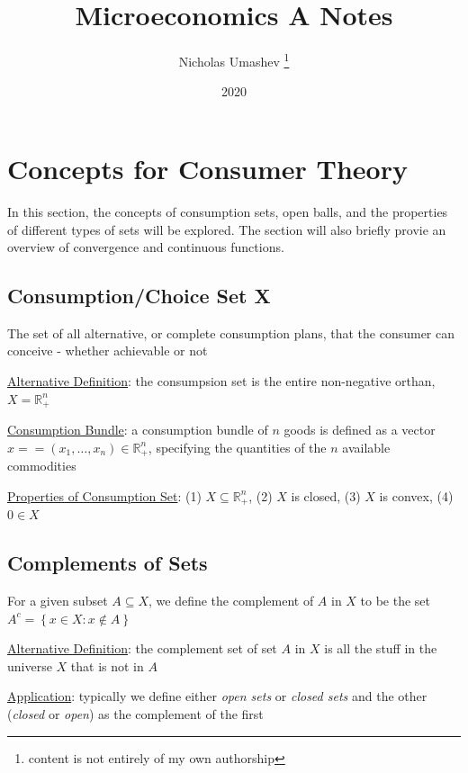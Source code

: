 \documentclass{article}
\title{Microeconomics A Notes}
\author{Nicholas Umashev \footnote{content is not entirely of my own authorship}}
\date{2020}
\begin{document}
\maketitle

\tableofcontents

\newpage

\vspace{2.5mm}
\section{Concepts for Consumer Theory}
In this section, the concepts of consumption sets, open balls, and the properties of different types of sets will be explored. The section will also briefly provie an overview of convergence and continuous functions. \par
\vspace{6mm}
\subsection{Consumption/Choice Set X}
The set of all alternative, or complete consumption plans, that the consumer can conceive - whether achievable or not \par \vspace{0.3em}
  \underline{Alternative Definition}: the consumpsion set is the entire non-negative orthan, $X = \mathbb{R}^{n}_{+}$ \par
  \underline{Consumption Bundle}: a consumption bundle of $n$ goods is defined as a vector $x == (x_{1}, \dots, x_{n}) \in \mathbb{R}_{+}^{n}$, specifying the quantities of the $n$ available commodities \par
  \underline{Properties of Consumption Set}: (1) $X \subseteq \mathbb{R}_{+}^{n}$, (2) $X$ is closed, (3) $X$ is convex, (4) $0 \in X$ \par
\vspace{6mm}
\subsection{Complements of Sets}
For a given subset $A \subseteq X$, we define the complement of $A$ in $X$ to be the set $A^{c} = \left\{ x \in X: x \notin A \right\}$ \par \vspace{0.3em}
  \underline{Alternative Definition}: the complement set of set $A$ in $X$ is all the stuff in the universe $X$ that is not in $A$ \par
  \underline{Application}: typically we define either \textit{open sets} or \textit{closed sets} and the other (\textit{closed} or \textit{open}) as the complement of the first \par
\vspace{6mm}
\end{document}
